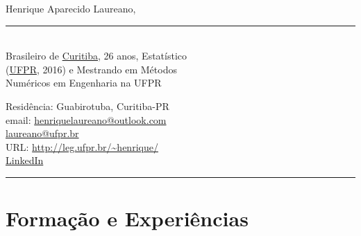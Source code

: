 \documentclass[12pt]{article}
\newcommand{\horrule}[1]{\noindent\rule{\linewidth}{#1}}
\begin{document}
\noindent
\begin{minipage}[t]{.565\textwidth}
 \raggedright
 \large Henrique Aparecido Laureano,
 \noindent\rule{.85\linewidth}{1pt}\\
 \normalsize
 Brasileiro de \href{https://goo.gl/K1Qcdv}{Curitiba}, 26 anos,
 Estat\'{i}stico\\ (\href{https://goo.gl/DtVAbi}{UFPR}, 2016) e
 Mestrando em M\'{e}todos\\ Num\'{e}ricos em Engenharia na UFPR
\end{minipage}%
\begin{minipage}[t]{.435\textwidth}
 \raggedright
 Resid\^{e}ncia: Guabirotuba, Curitiba-PR\\
 email:
 \href{mailto:henriquelaureano@outlook.com}{henriquelaureano@outlook.com}\\
 \hspace{1.2cm} \href{mailto:laureano@ufpr.br}{laureano@ufpr.br}\\
 URL: \url{http://leg.ufpr.br/~henrique/}\\
 \href{https://www.linkedin.com/in/henrique-laureano-025328179}{LinkedIn}
\end{minipage}

\vspace{.5cm}
\horrule{1pt}

\section*{Forma\c{c}\~{a}o e Experi\^{e}ncias}
\end{document}
